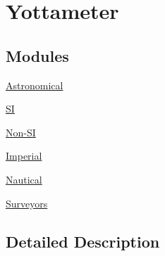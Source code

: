 \hypertarget{group___e_g_x_math-_conversions-_length_conversions-_s_i-_yottameter}{}\section{Yottameter}
\label{group___e_g_x_math-_conversions-_length_conversions-_s_i-_yottameter}
\subsection*{Modules}
\begin{DoxyCompactItemize}
\item 
\mbox{\hyperlink{group___e_g_x_math-_conversions-_length_conversions-_s_i-_yottameter-_astronomical}{Astronomical}}
\item 
\mbox{\hyperlink{group___e_g_x_math-_conversions-_length_conversions-_s_i-_yottameter-_s_i}{SI}}
\item 
\mbox{\hyperlink{group___e_g_x_math-_conversions-_length_conversions-_s_i-_yottameter-_non-_s_i}{Non-\/\+SI}}
\item 
\mbox{\hyperlink{group___e_g_x_math-_conversions-_length_conversions-_s_i-_yottameter-_imperial}{Imperial}}
\item 
\mbox{\hyperlink{group___e_g_x_math-_conversions-_length_conversions-_s_i-_yottameter-_nautical}{Nautical}}
\item 
\mbox{\hyperlink{group___e_g_x_math-_conversions-_length_conversions-_s_i-_yottameter-_surveyors}{Surveyors}}
\end{DoxyCompactItemize}


\subsection{Detailed Description}
